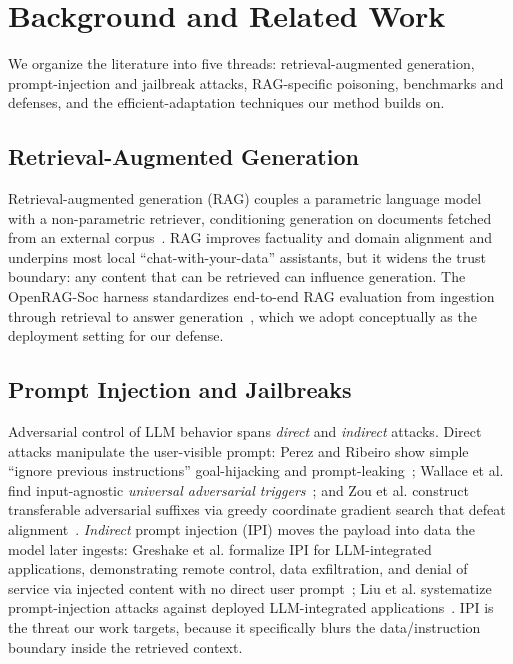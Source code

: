 \documentclass[11pt]{article}
\begin{document}
\section{Background and Related Work}
We organize the literature into five threads: retrieval-augmented generation,
prompt-injection and jailbreak attacks, RAG-specific poisoning, benchmarks and
defenses, and the efficient-adaptation techniques our method builds on.

\subsection{Retrieval-Augmented Generation}
Retrieval-augmented generation (RAG) couples a parametric language model with a
non-parametric retriever, conditioning generation on documents fetched from an
external corpus~\cite{lewis}. RAG improves factuality and domain alignment and
underpins most local ``chat-with-your-data'' assistants, but it widens the trust
boundary: any content that can be retrieved can influence generation. The
OpenRAG-Soc harness standardizes end-to-end RAG evaluation from ingestion through
retrieval to answer generation~\cite{openragsoc}, which we adopt conceptually as the
deployment setting for our defense.

\subsection{Prompt Injection and Jailbreaks}
Adversarial control of LLM behavior spans \emph{direct} and \emph{indirect} attacks.
Direct attacks manipulate the user-visible prompt: Perez and Ribeiro show simple
``ignore previous instructions'' goal-hijacking and prompt-leaking~\cite{perez};
Wallace et al. find input-agnostic \emph{universal adversarial triggers}~\cite{wallace};
and Zou et al. construct transferable adversarial suffixes via greedy coordinate
gradient search that defeat alignment~\cite{gcg}. \emph{Indirect} prompt injection
(IPI) moves the payload into data the model later ingests: Greshake et al. formalize
IPI for LLM-integrated applications, demonstrating remote control, data exfiltration,
and denial of service via injected content with no direct user prompt~\cite{greshake};
Liu et al. systematize prompt-injection attacks against deployed LLM-integrated
applications~\cite{liu}. IPI is the threat our work targets, because it specifically
blurs the data/instruction boundary inside the retrieved context.
\end{document}
